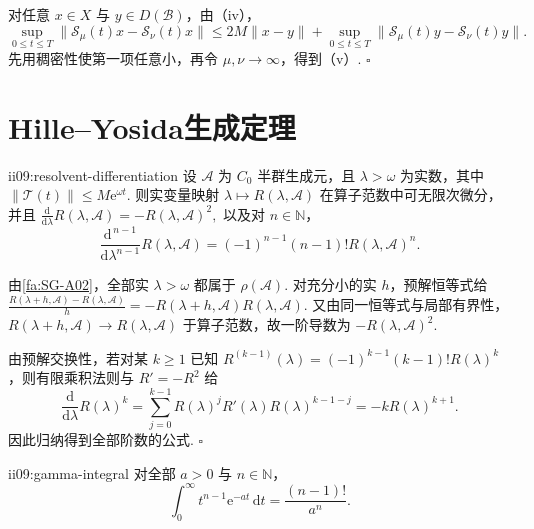 \begin{FAProof}
对任意 \(\displaystyle x\in X\) 与 \(\displaystyle y\in D(\mathcal B)\)，由（iv），
\[
\sup_{0\leqslant t\leqslant T}
\|\mathcal S_\mu(t)x-\mathcal S_\nu(t)x\|
\leqslant
2M\|x-y\|
+
\sup_{0\leqslant t\leqslant T}
\|\mathcal S_\mu(t)y-\mathcal S_\nu(t)y\|.
\]
先用稠密性使第一项任意小，再令 \(\displaystyle\mu,\nu\to\infty\)，得到（v）.
\hfill\(\square\)
\end{FAProof}

\section{Hille--Yosida生成定理}\label{sec:ii09-hille-yosida}

\begin{FALemma}[B][预解的算子范数微分]{ii09:resolvent-differentiation}
设 \(\displaystyle\mathcal A\) 为 \(\displaystyle C_0\) 半群生成元，且 \(\displaystyle\lambda>\omega\) 为实数，其中 \(\displaystyle\|\mathcal T(t)\|\leqslant M\mathrm{e}^{\omega t}\). 则实变量映射 \(\displaystyle\lambda\mapsto R(\lambda,\mathcal A)\) 在算子范数中可无限次微分，并且 \(\displaystyle \frac{\mathrm{d}}{\mathrm{d}\lambda}R(\lambda,\mathcal A) = -R(\lambda,\mathcal A)^2,\)
以及对 \(\displaystyle n\in\mathbb N\)，
\[
\frac{\mathrm{d}^{\,n-1}}{\mathrm{d}\lambda^{n-1}}R(\lambda,\mathcal A)
=
(-1)^{n-1}(n-1)!R(\lambda,\mathcal A)^n.
\]
\end{FALemma}

\begin{FAProof}
由\autoref{fa:SG-A02}，全部实 \(\displaystyle\lambda>\omega\) 都属于 \(\displaystyle\rho(\mathcal A)\). 对充分小的实 \(\displaystyle h\)，预解恒等式给 \(\displaystyle \frac{R(\lambda+h,\mathcal A)-R(\lambda,\mathcal A)}{h} = -R(\lambda+h,\mathcal A)R(\lambda,\mathcal A).\)
又由同一恒等式与局部有界性，\(\displaystyle R(\lambda+h,\mathcal A)\to R(\lambda,\mathcal A)\) 于算子范数，故一阶导数为 \(\displaystyle-R(\lambda,\mathcal A)^2\).

由预解交换性，若对某 \(\displaystyle k\geqslant1\) 已知 \(\displaystyle R^{(k-1)}(\lambda)=(-1)^{k-1}(k-1)!R(\lambda)^k\)，则有限乘积法则与 \(\displaystyle R'=-R^2\) 给
\[
\frac{\mathrm{d}}{\mathrm{d}\lambda}R(\lambda)^k
=
\sum_{j=0}^{k-1}R(\lambda)^jR'(\lambda)R(\lambda)^{k-1-j}
=
-kR(\lambda)^{k+1}.
\]
因此归纳得到全部阶数的公式.
\hfill\(\square\)
\end{FAProof}

\begin{FALemma}[B][指数矩积分]{ii09:gamma-integral}
对全部 \(\displaystyle a>0\) 与 \(\displaystyle n\in\mathbb N\)，
\[
\int_0^\infty t^{n-1}\mathrm{e}^{-at}\,\mathrm{d}t
=
\frac{(n-1)!}{a^n}.
\]
\end{FALemma}

